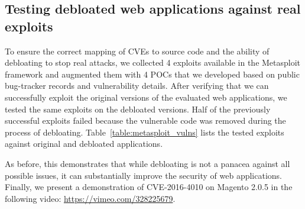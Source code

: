 
\subsection{Testing debloated web applications against real exploits}
\label{section:metasploit}
To ensure the correct mapping of CVEs to source code and the ability of debloating to stop real attacks, we collected 4 exploits available in the Metasploit framework and augmented them with 4 POCs that we developed based on public bug-tracker records and vulnerability details. After verifying that we can successfully exploit the original versions of the evaluated web applications, we tested the same exploits on the debloated versions. Half of the previously successful exploits failed because the vulnerable code was removed during the process of debloating. Table~\ref{table:metasploit_vulns} lists the tested exploits against original and debloated applications.

As before, this demonstrates that while debloating is not a panacea against all possible issues, it can substantially improve the security of web applications. Finally, we present a demonstration of CVE-2016-4010 on Magento 2.0.5 in the following video: \url{https://vimeo.com/328225679}.



